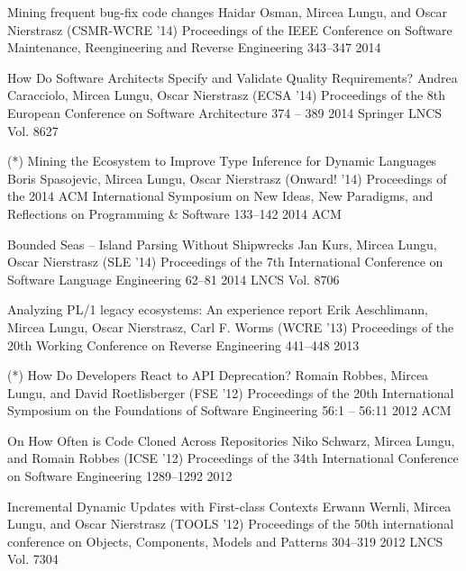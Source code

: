 \begin{enumerate}


\densepap
	{Mining frequent bug-fix code changes}
	{Haidar Osman, Mircea Lungu, and Oscar Nierstrasz}
	{(CSMR-WCRE '14) Proceedings of the IEEE Conference on Software Maintenance, Reengineering and Reverse Engineering }
	{343--347}
	{2014}
	{\IEEE}



\densepap
	{How Do Software Architects Specify and Validate Quality Requirements?}
	{Andrea Caracciolo, Mircea Lungu, Oscar Nierstrasz}
	{(ECSA '14) Proceedings of the 8th European Conference on Software Architecture }
	{374 -- 389}
	{2014}
	{Springer LNCS Vol. 8627}

\densepap
	{(*) Mining the Ecosystem to Improve Type Inference for Dynamic Languages}
	{Boris Spasojevic, Mircea Lungu, Oscar Nierstrasz}
	{(Onward! '14) Proceedings of the 2014 ACM International Symposium on New Ideas, New Paradigms, and Reflections on Programming \& Software }
	{133--142}
	{2014}
	{ACM}

\densepap
	{Bounded Seas -- Island Parsing Without Shipwrecks}
	{Jan Kurs, Mircea Lungu, Oscar Nierstrasz}
	{(SLE '14) Proceedings of the 7th International Conference on Software Language Engineering }
	{62--81}
	{2014}
	{LNCS Vol. 8706}

\densepap
	{Analyzing PL/1 legacy ecosystems: An experience report}
	{Erik Aeschlimann, Mircea Lungu, Oscar Nierstrasz, Carl F. Worms}
	{(WCRE '13) Proceedings of the 20th Working Conference on Reverse  Engineering }
	{441--448}
	{2013}
	{\IEEE}

\densepap
	{(*) How Do Developers React to API Deprecation?}
	{Romain Robbes, Mircea Lungu, and David Roetlisberger}
	{(FSE '12) Proceedings of the 20th International Symposium on the Foundations of Software Engineering }
	{56:1 -- 56:11}
	{2012}
	{ACM}

\densepap
	{On How Often is Code Cloned Across Repositories}
	{Niko Schwarz, Mircea Lungu, and Romain Robbes}
	{(ICSE '12) Proceedings of the 34th International Conference on Software Engineering }
	{1289--1292}
	{2012}
	{\IEEE}

\densepap
	{Incremental Dynamic Updates with First-class Contexts}
	{Erwann Wernli, Mircea Lungu, and Oscar Nierstrasz}
	{(TOOLS '12) Proceedings of the 50th international conference on Objects, Components, Models and Patterns}
	{304--319}
	{2012}
	{LNCS Vol. 7304}




\end{enumerate}
